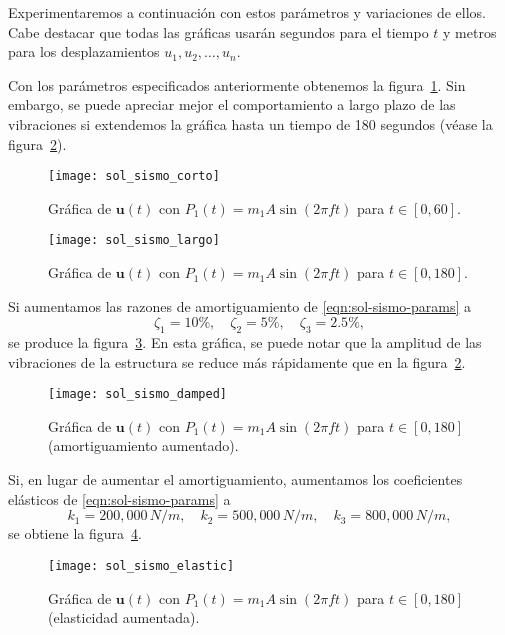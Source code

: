 Experimentaremos a continuación con estos parámetros y variaciones de ellos. Cabe destacar que todas las gráficas usarán segundos para el tiempo \(t\) y metros para los desplazamientos \(u_1, u_2, \ldots, u_n\).

Con los parámetros especificados anteriormente obtenemos la figura~\ref{fig:sol-sismo-corto}. Sin embargo, se puede apreciar mejor el comportamiento a largo plazo de las vibraciones si extendemos la gráfica hasta un tiempo de 180 segundos (véase la figura~\ref{fig:sol-sismo-largo}).


\begin{figure}[ht!]
    \centering
    \texttt{[image: sol\_sismo\_corto]}
    \caption{Gráfica de \(\mathbf{u}(t)\) con \(P_1(t) = m_1 A \sin(2\pi f t)\) para \(t \in [0, 60]\).}
    \label{fig:sol-sismo-corto}
\end{figure}

\begin{figure}[ht!]
    \centering
    \texttt{[image: sol\_sismo\_largo]}
    \caption{Gráfica de \(\mathbf{u}(t)\) con \(P_1(t) = m_1 A \sin(2\pi f t)\) para \(t \in [0, 180]\).}
    \label{fig:sol-sismo-largo}
\end{figure}

Si aumentamos las razones de amortiguamiento de \eqref{eqn:sol-sismo-params} a
\[
    \zeta_1 = 10\%, \quad \zeta_2 = 5\%, \quad \zeta_3 = 2.5\%
,\]
se produce la figura~\ref{fig:sol-sismo-damped}. En esta gráfica, se puede notar que la amplitud de las vibraciones de la estructura se reduce más rápidamente que en la figura~\ref{fig:sol-sismo-largo}.

\begin{figure}[ht!]
    \centering
    \texttt{[image: sol\_sismo\_damped]}
    \caption{Gráfica de \(\mathbf{u}(t)\) con \(P_1(t) = m_1 A \sin(2\pi f t)\) para \(t \in [0, 180]\) (amortiguamiento aumentado).}
    \label{fig:sol-sismo-damped}
\end{figure}

Si, en lugar de aumentar el amortiguamiento, aumentamos los coeficientes elásticos de \eqref{eqn:sol-sismo-params} a
\[
    k_1 = 200,000 \, \si{N/m}, \quad k_2 = 500,000 \, \si{N/m}, \quad k_3 = 800,000 \, \si{N/m}
,\]
se obtiene la figura~\ref{fig:sol-sismo-elastic}.

\begin{figure}[ht!]
    \centering
    \texttt{[image: sol\_sismo\_elastic]}
    \caption{Gráfica de \(\mathbf{u}(t)\) con \(P_1(t) = m_1 A \sin(2\pi f t)\) para \(t \in [0, 180]\) (elasticidad aumentada).}
    \label{fig:sol-sismo-elastic}
\end{figure}

